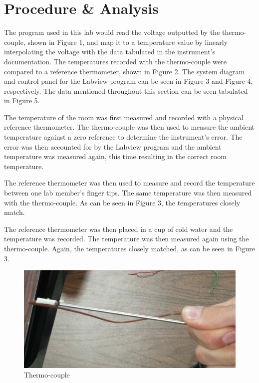 \documentclass[12pt]{article}
\begin{document}
\section*{\fontsize{12}{12}\selectfont \large Procedure \& Analysis}

The program used in this lab would read the voltage outputted by the thermo-couple, shown in Figure 1, and map it to a temperature value by linearly interpolating the voltage with the data tabulated in the instrument's documentation. The temperatures recorded with the thermo-couple were compared to a reference thermometer, shown in Figure 2. The system diagram and control panel for the Labview program can be seen in Figure 3 and Figure 4, respectively. The data mentioned throughout this section can be seen tabulated in Figure 5. 
\bigskip

The temperature of the room was first measured and recorded with a physical reference thermometer. The thermo-couple was then used to measure the ambient temperature against a zero reference to determine the instrument's error. The error was then accounted for by the Labview program and the ambient temperature was measured again, this time resulting in the correct room temperature. 
\bigskip
 
 The reference thermometer was then used to measure and record the temperature between one lab member's finger tips. The same temperature was then measured with the thermo-couple. As can be seen in Figure 3, the temperatures closely match. 
\bigskip
 
The reference thermometer was then placed in a cup of cold water and the temperature was recorded. The temperature was then measured again using the thermo-couple. Again, the temperatures closely matched, as can be seen in Figure 3.
\bigskip

\newpage

\begin{figure}[h!] %
   \centering
   \includegraphics[width=\linewidth]{thermocouple.jpg} 
   \caption{Thermo-couple}
   \label{fig:example}
\end{figure}
\end{document}
